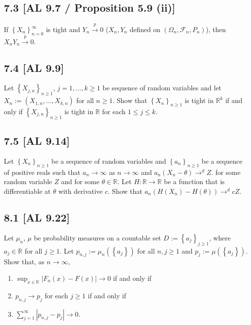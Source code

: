 \documentclass[12pt]{article}
\begin{document}
\subsection*{7.3 [AL 9.7 / Proposition 5.9 (ii)]}
\begin{tcolorbox}
If $\left\{ X_{n} \right\}_{n=0}^{\infty}$ is tight and $Y_{n} \stackrel{p}{\rightarrow} 0$ ($X_{n}, Y_{n}$ defined on $(\Omega_{n}, \mathcal{F}_{n},
P_{n})$), then $X_{n}Y_{n} \stackrel{p}{\rightarrow} 0$.
\end{tcolorbox}


\subsection*{7.4 [AL 9.9]}
\begin{tcolorbox}
Let $\left\{ X_{j,n} \right\}_{n\geq 1}$, $j = 1, \hdots, k \geq 1$ be sequence of random variables and let $X_{n} := \left( X_{1,n}, \hdots, X_{k,n}
\right)$ for all $n \geq 1$. Show that $\left\{ X_{n} \right\}_{n\geq 1}$ is tight in $\mathbb{R}^{k}$ if and only if $\left\{ X_{j,n} \right\}_{n\geq
1}$ is tight in $\mathbb{R}$ for each $1 \leq j \leq k$.
\end{tcolorbox}


\subsection*{7.5 [AL 9.14]}
\begin{tcolorbox}
Let $\left\{ X_{n} \right\}_{n\geq 1}$ be a sequence of random variables and $\left\{ a_n \right\}_{n\geq 1}$ be a sequence of positive reals such
that $a_n \rightarrow \infty$ as $n \rightarrow \infty$ and $a_n(X_n - \theta) \rightarrow^{d} Z$.
for some random variable $Z$ and for some $\theta \in \mathbb{R}$. Let $H : \mathbb{R} \rightarrow \mathbb{R}$ be a function that is differentiable at
$\theta$ with derivative $c$. Show that 
$a_n(H(X_n) - H(\theta)) \rightarrow^{d} cZ$. 
\end{tcolorbox}



\subsection*{8.1 [AL 9.22]}
\begin{tcolorbox}
Let $\mu_n$, $\mu$ be probability measures on a countable set $D := \left\{ a_{j} \right\}_{j\geq 1}$, where $a_j \in \mathbb{R}$ for all $j \geq 1$.
Let $p_{n,j} := \mu_{n}\left( \left\{ a_j \right\} \right)$ for all $n,j\geq 1$ and $p_j := \mu\left( \left\{ a_j \right\} \right)$. Show that, as $n
\rightarrow \infty$,
\begin{enumerate}[label = (\roman*)]
\item $\sup_{x\in\mathbb{R}}|F_n(x) - F(x)| \rightarrow 0$ if and only if
\item $p_{n,j} \rightarrow p_{j}$ for each $j \geq 1$ if and only if
\item $\sum_{j=1}^{\infty}|p_{n,j} - p_j| \rightarrow 0$.
\end{enumerate}
\end{tcolorbox}
\end{document}
